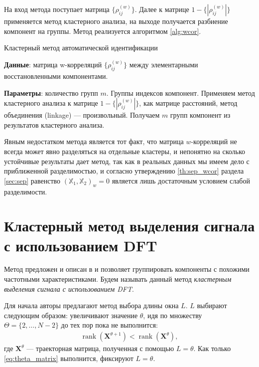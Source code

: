 \documentclass[specialist,
               substylefile = spbu.rtx,
               subf,href,colorlinks=true, 12pt]{disser}
\def\rank{\mathop{\mathrm{rank}}}
\begin{document}
На вход метода поступает матрица $\{\rho^{(w)}_{ij}\}$. Далее к матрице $1 -\{|\rho^{(w)}_{ij}|\}$ применяется метод кластерного анализа, на выходе получается разбиение компонент на группы. Метод реализуется алгоритмом \ref{alg:wcor}.

 \begin{algorithm}[!hhh]
\caption{Кластерный метод автоматической идентификации}
\label{alg:wcor}
\begin{algorithmic}[1]
\REQUIRE 
\item \textbf{Данные}: матрица w-корреляций $\{\rho^{(w)}_{ij}\}$ между элементарными восстановленными компонентами.
\item \textbf{Параметры}: количество групп $m$.
\ENSURE Группы индексов компонент.
\STATE  Применяем метод кластерного анализа к матрице $1 -\{|\rho^{(w)}_{ij}|\}$, как матрице расстояний, метод объединения (linkage) --- произвольный.
\STATE Получаем $m$ групп компонент из результатов кластерного анализа.
\end{algorithmic}
\end{algorithm}

Явным недостатком метода является тот факт, что матрица $w$-корреляций не всегда может явно разделяться на отдельные кластеры, и непонятно на сколько устойчивые результаты дает метод, так как в реальных данных мы имеем дело с приближенной разделимостью, и согласно утверждению \ref{th:sep_wcor} раздела \ref{sec:sep} равенство $\left(\mathbb{X}_1, \mathbb{X}_2 \right)_w = 0$ является лишь достаточным условием слабой разделимости.

\section{Кластерный метод выделения сигнала с использованием DFT}
Метод предложен и описан в \cite{Alvarez2013} и позволяет группировать компоненты с похожими частотными характеристиками. Будем называть данный метод \textit{кластерным выделения сигнала с использованием DFT}.

Для начала авторы предлагают метод выбора длины окна $L$.
$L$ выбирают следующим образом: увеличивают значение $\theta$, идя по множеству $\Theta = \{2,\ldots,N -2\}$ до тех пор пока не выполнится:
\begin{gather}
\label{eq:theta_matrix}
\rank(\mathbf{X}^{\theta+1}) < \rank(\mathbf{X}^{\theta}),
\end{gather}
где $\mathbf{X}^{\theta}$ --- траекторная матрица, полученная с помощью $L = \theta$. Как только \eqref{eq:theta_matrix} выполнится, фиксируют $L = \theta$.
\end{document}
